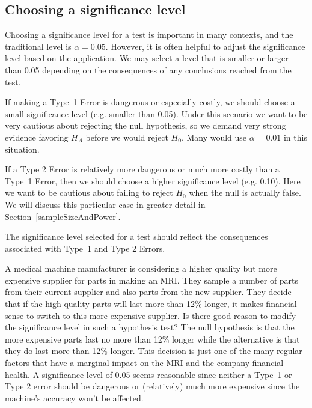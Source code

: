 \subsection{Choosing a significance level}
\label{significanceLevel}


Choosing a significance level for a test is important in many contexts, and the traditional level is $\alpha=0.05$. However, it is often helpful to adjust the significance level based on the application. We may select a level that is smaller or larger than 0.05 depending on the consequences of any conclusions reached from the test.

If making a Type~1 Error is dangerous or especially costly, we should choose a small significance level (e.g. smaller than 0.05). Under this scenario we want to be very cautious about rejecting the null hypothesis, so we demand very strong evidence favoring $H_A$ before we would reject $H_0$. Many would use $\alpha=0.01$ in this situation. 

If a Type 2 Error is relatively more dangerous or much more costly than a Type~1 Error, then we should choose a higher significance level (e.g. 0.10). Here we want to be cautious about failing to reject $H_0$ when the null is actually false.  We will discuss this particular case in greater detail in Section~\ref{sampleSizeAndPower}.

\begin{tipBox}{
The significance level selected for a test should reflect the consequences associated with Type~1 and Type 2 Errors.}
\end{tipBox}

\begin{example}{A medical machine manufacturer is considering a higher quality but more expensive supplier for parts in making an MRI. They sample a number of parts from their current supplier and also parts from the new supplier. They decide that if the high quality parts will last more than 12\% longer, it makes financial sense to switch to this more expensive supplier. Is there good reason to modify the significance level in such a hypothesis test?}
The null hypothesis is that the more expensive parts last no more than 12\% longer while the alternative is that they do last more than 12\% longer. This decision is just one of the many regular factors that have a marginal impact on the MRI and the company financial health. A significance level of 0.05 seems reasonable since neither a Type~1 or Type 2 error should be dangerous or (relatively) much more expensive since the machine's accuracy won't be affected.
\end{example}

